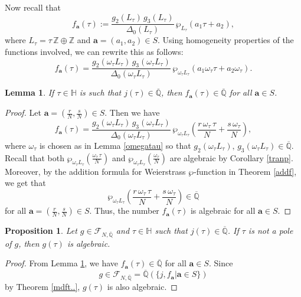 \documentclass[11pt, reqno]{amsart}
\newtheorem{lemma}[theorem]{Lemma}
\newtheorem{prop}[theorem]{Proposition}
\begin{document}
Now recall that
$$
f_{\boldsymbol{a}}(\tau):=\frac{g_2(L_\tau)\,g_3(L_\tau)}{\Delta_0(L_\tau)}\,\wp_{L_\tau}(a_1\tau+a_2),
$$ 
where $L_\tau=\tau\,\mathbb{Z}\oplus\mathbb{Z}$ and ${\boldsymbol{a}}=(a_1,a_2)\in S$. Using homogeneity properties of the functions involved, we can rewrite this as follows:
$$
f_{\boldsymbol{a}}(\tau)=\frac{g_2(\omega_\tau L_\tau)\, g_3(\omega_\tau L_\tau)}{\Delta_0(\omega_\tau L_\tau)}\,\wp_{\omega_\tau L_\tau}(a_1\omega_\tau\tau+a_2\omega_\tau).
$$
\begin{lemma}\label{algfa}
    If $\tau\in\mathbb{H}$ is such that $j(\tau)\in\overline{\mathbb{Q}}$, then $f_{\boldsymbol{a}}(\tau)\in\overline{\mathbb{Q}}$ for all ${\boldsymbol{a}}\in S$.
\end{lemma}
\begin{proof}
    Let ${\boldsymbol{a}}=\left( \frac{r}{N},\frac{s}{N} \right)\in S$. Then we have
$$
f_{\boldsymbol{a}}(\tau)=\frac{g_2(\omega_\tau L_\tau)\, g_3(\omega_\tau L_\tau)}{\Delta_0(\omega_\tau L_\tau)}\,\wp_{\omega_\tau L_\tau}\left(\frac{r\,\omega_\tau\,\tau}{N}+\frac{s\,\omega_\tau}{N}\right),
$$
where $\omega_\tau$ is chosen as in Lemma \ref{omegatau} so that $g_2(\omega_\tau L_\tau),\, g_3(\omega_\tau L_\tau)\in\overline{\mathbb{Q}}$.\\

Recall that both $\wp_{\omega_\tau L_\tau}\left(\frac{\omega_\tau\, \tau}{N} \right)$ and $\wp_{\omega_\tau L_\tau}\left(\frac{\omega_\tau}{N} \right)$  are algebraic by Corollary \ref{tranp}. Moreover, by the addition formula for Weierstrass $\wp$-function in Theorem \ref{addf}, we get that $$\wp_{\omega_\tau L_\tau}\left(\frac{r\,\omega_\tau\, \tau}{N}+\frac{s\,\omega_\tau}{N}\right)\in\overline{\mathbb{Q}}$$ for all ${\boldsymbol{a}}=\left(\frac{r}{N},\frac{s}{N}\right)\in S$. Thus, the number $f_{\boldsymbol{a}}(\tau)$ is algebraic for all ${\boldsymbol{a}}\in S$.
\end{proof}
\begin{prop}\label{algemf}
Let $g\in \mathcal{F}_{N,\overline{\mathbb{{Q}}}}$ and $\tau\in\mathbb{H}$ such that $j(\tau)\in \overline{\mathbb{Q}}$. If $\tau$ is not a pole of $g$, then $g(\tau)$ is algebraic.
\end{prop}
\begin{proof}
 From Lemma \ref{algfa}, we have   $f_{\boldsymbol{a}}(\tau)\in\overline{\mathbb{Q}}$ for all ${\boldsymbol{a}}\in S$. Since 
 $$g \in \mathcal{F}_{N,\overline{\mathbb{Q}}}=  \overline{\mathbb{Q}}\left(\{j,f_{\boldsymbol{a}} |{\boldsymbol{a}}\in S\}\right)$$
 by Theorem \ref{mdft..}, $g(\tau)$ is also algebraic. 
\end{proof}
\bigskip
\end{document}
